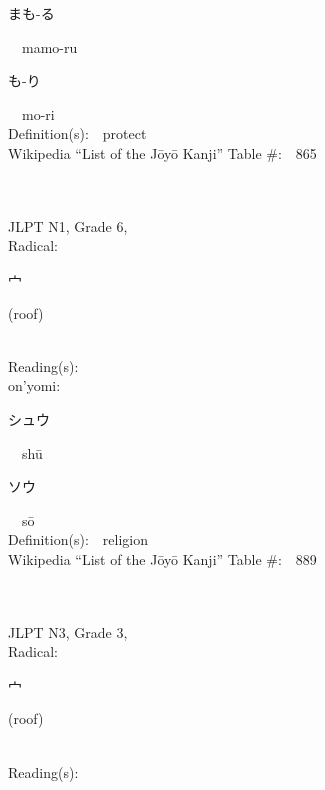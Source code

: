 \begin{multicols}{2}
{\hspace*{2em}}{\begin{CJK}{UTF8}{min} まも-る \end{CJK}}\ \ mamo-ru\ \ \\
{\hspace*{2em}}{\begin{CJK}{UTF8}{min} も-り \end{CJK}}\ \ mo-ri\ \ \\
Definition(s):\ \ protect \\
Wikipedia ``List of the J\=oy\=o Kanji'' Table \#:\ \ 865 \\
\ \ \\
{\fontsize{34pt}{40pt}  }\ \ \\  %
{JLPT N1, Grade 6, \\Radical:\ \ {\begin{CJK}{UTF8}{min} 宀 \end{CJK}} (roof) } \\
Reading(s):\ \ \\
{\hspace*{1em}}on'yomi:\ \ \\
{\hspace*{2em}}{\begin{CJK}{UTF8}{min} シュウ \end{CJK}}\ \ sh\=u\ \ \\
{\hspace*{2em}}{\begin{CJK}{UTF8}{min} ソウ \end{CJK}}\ \ s\=o\ \ \\
Definition(s):\ \ religion \\
Wikipedia ``List of the J\=oy\=o Kanji'' Table \#:\ \ 889 \\
\ \ \\
{\fontsize{34pt}{40pt}  }\ \ \\  %
{JLPT N3, Grade 3, \\Radical:\ \ {\begin{CJK}{UTF8}{min} 宀 \end{CJK}} (roof) } \\
Reading(s):\ \ \\

\end{multicols}
